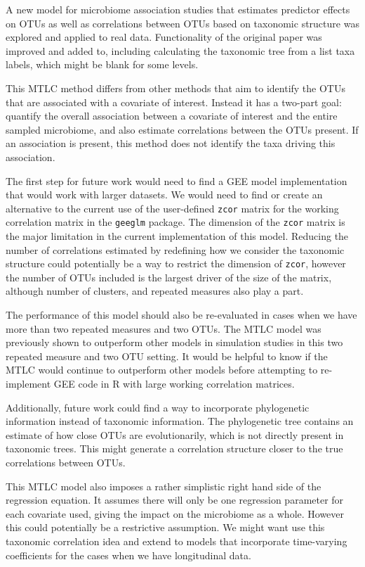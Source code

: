 \documentclass[12pt]{article}
\begin{document}
A new model for microbiome association studies that estimates predictor effects on OTUs as well as correlations between OTUs based on taxonomic structure was explored and applied to real data. Functionality of the original paper was improved and added to, including calculating the taxonomic tree from a list taxa labels, which might be blank for some levels.

This MTLC method differs from other methods that aim to identify the OTUs that are associated with a covariate of interest. Instead it has a two-part goal: quantify the overall association between a covariate of interest and the entire sampled microbiome, and also estimate correlations between the OTUs present. If an association is present, this method does not identify the taxa driving this association.

The first step for future work would need to find a GEE model implementation that would work with larger datasets. We would need to find or create an alternative to the current use of the user-defined \texttt{zcor} matrix for the working correlation matrix in the \texttt{geeglm} package. The dimension of the \texttt{zcor} matrix is the major limitation in the current implementation of this model. Reducing the number of correlations estimated by redefining how we consider the taxonomic structure could potentially be a way to restrict the dimension of \texttt{zcor}, however the number of OTUs included is the largest driver of the size of the matrix, although number of clusters, and repeated measures also play a part.

The performance of this model should also be re-evaluated in cases when we have more than two repeated measures and two OTUs. The MTLC model was previously shown to outperform other models in simulation studies in this two repeated measure and two OTU setting. It would be helpful to know if the MTLC would continue to outperform other models before attempting to re-implement GEE code in R with large working correlation matrices.

Additionally, future work could find a way to incorporate phylogenetic information instead of taxonomic information. The phylogenetic tree contains an estimate of how close OTUs are evolutionarily, which is not directly present in taxonomic trees. This might generate a correlation structure closer to the true correlations between OTUs.

This MTLC model also imposes a rather simplistic right hand side of the regression equation. It assumes there will only be one regression parameter for each covariate used, giving the impact on the microbiome as a whole. However this could potentially be a restrictive assumption. We might want use this taxonomic correlation idea and extend to models that incorporate time-varying coefficients for the cases when we have longitudinal data.









\begin{singlespace}
\printbibliography
\end{singlespace}
\end{document}
